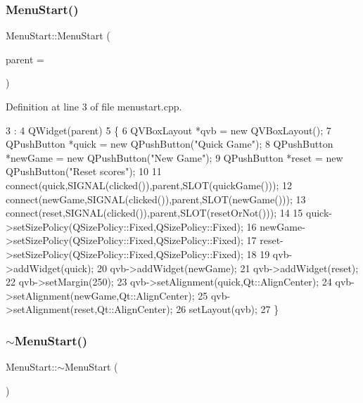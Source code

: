 \subsubsection{\texorpdfstring{Menu\+Start()}{MenuStart()}}
{\footnotesize\ttfamily Menu\+Start\+::\+Menu\+Start (\begin{DoxyParamCaption}\item[{Q\+Widget $\ast$}]{parent = {} }\end{DoxyParamCaption})\hspace{0.3cm}{\ttfamily [explicit]}}



Definition at line 3 of file menustart.\+cpp.


\begin{DoxyCode}
3                                     :
4     QWidget(parent)
5 \{
6     QVBoxLayout *qvb = \textcolor{keyword}{new} QVBoxLayout();
7     QPushButton *quick = \textcolor{keyword}{new} QPushButton(\textcolor{stringliteral}{"Quick Game"});
8     QPushButton *newGame = \textcolor{keyword}{new} QPushButton(\textcolor{stringliteral}{"New Game"});
9     QPushButton *reset = \textcolor{keyword}{new} QPushButton(\textcolor{stringliteral}{"Reset scores"});
10 
11     connect(quick,SIGNAL(clicked()),parent,SLOT(quickGame()));
12     connect(newGame,SIGNAL(clicked()),parent,SLOT(newGame()));
13     connect(reset,SIGNAL(clicked()),parent,SLOT(resetOrNot()));
14 
15     quick->setSizePolicy(QSizePolicy::Fixed,QSizePolicy::Fixed);
16     newGame->setSizePolicy(QSizePolicy::Fixed,QSizePolicy::Fixed);
17     reset->setSizePolicy(QSizePolicy::Fixed,QSizePolicy::Fixed);
18 
19     qvb->addWidget(quick);
20     qvb->addWidget(newGame);
21     qvb->addWidget(reset);
22     qvb->setMargin(250);
23     qvb->setAlignment(quick,Qt::AlignCenter);
24     qvb->setAlignment(newGame,Qt::AlignCenter);
25     qvb->setAlignment(reset,Qt::AlignCenter);
26     setLayout(qvb);
27 \}
\end{DoxyCode}
\hypertarget{class_menu_start_a3c8fe892ee7171d64a9857f44ad326ba}{}\label{class_menu_start_a3c8fe892ee7171d64a9857f44ad326ba} 
\subsubsection{\texorpdfstring{$\sim$\+Menu\+Start()}{~MenuStart()}}
{\footnotesize\ttfamily Menu\+Start\+::$\sim$\+Menu\+Start (\begin{DoxyParamCaption}{ }\end{DoxyParamCaption})}



